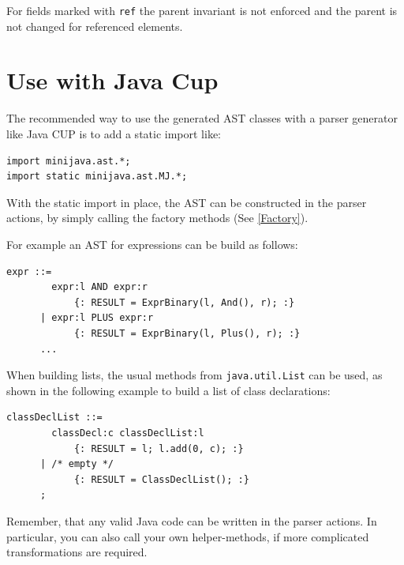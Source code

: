 \documentclass{scrartcl}
\begin{document}
For fields marked with \lstinline!ref! the parent invariant is not enforced and the parent is not changed for referenced elements.



\section{Use with Java Cup}

The recommended way to use the generated AST classes with a parser generator like Java CUP is to add a static import like:

\begin{lstlisting}
import minijava.ast.*;
import static minijava.ast.MJ.*;
\end{lstlisting}

With the static import in place, the AST can be constructed in the parser actions, by simply calling the factory methods (See \ref{Factory}).

For example an AST for expressions can be build as follows:

\begin{lstlisting}
expr ::=
        expr:l AND expr:r
            {: RESULT = ExprBinary(l, And(), r); :}
      | expr:l PLUS expr:r
            {: RESULT = ExprBinary(l, Plus(), r); :}
      ...
\end{lstlisting}

When building lists, the usual methods from \lstinline!java.util.List! can be used, as shown in the following example to build  a list of class declarations:

\begin{lstlisting}
classDeclList ::=
        classDecl:c classDeclList:l
            {: RESULT = l; l.add(0, c); :}
      | /* empty */
            {: RESULT = ClassDeclList(); :}
      ;
\end{lstlisting}

Remember, that any valid Java code can be written in the parser actions.
In particular, you can also call your own helper-methods, if more complicated transformations are required.
\end{document}
